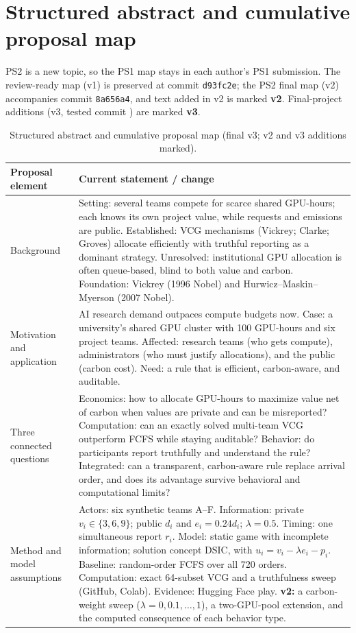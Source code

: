 \section{Structured abstract and cumulative proposal map}\label{app:abstract}
PS2 is a new topic, so the PS1 map stays in each author's PS1 submission. The review-ready map (v1) is preserved at commit \texttt{d93fc2e}; the PS2 final map (v2) accompanies commit \texttt{8a656a4}, and text added in v2 is marked \textbf{v2}. Final-project additions (v3, tested commit \texttt{\TestedCommit}) are marked \textbf{v3}.
\par\medskip
\begin{table}[H]
\caption{Structured abstract and cumulative proposal map (final v3; v2 and v3 additions marked).}
\label{tab:abstract-map}
\footnotesize\renewcommand{\arraystretch}{1.1}
\begin{tabularx}{\textwidth}{@{}p{}Y@{}}
\toprule
\textbf{Proposal element} & \textbf{Current statement / change} \\
\midrule
Background & Setting: several teams compete for scarce shared GPU-hours; each knows its own project value, while requests and emissions are public. Established: VCG mechanisms (Vickrey; Clarke; Groves) allocate efficiently with truthful reporting as a dominant strategy. Unresolved: institutional GPU allocation is often queue-based, blind to both value and carbon. Foundation: Vickrey (1996 Nobel) and Hurwicz--Maskin--Myerson (2007 Nobel). \\
Motivation and application & AI research demand outpaces compute budgets now. Case: a university's shared GPU cluster with 100 GPU-hours and six project teams. Affected: research teams (who gets compute), administrators (who must justify allocations), and the public (carbon cost). Need: a rule that is efficient, carbon-aware, and auditable. \\
Three connected questions & Economics: how to allocate GPU-hours to maximize value net of carbon when values are private and can be misreported? Computation: can an exactly solved multi-team VCG outperform FCFS while staying auditable? Behavior: do participants report truthfully and understand the rule? Integrated: can a transparent, carbon-aware rule replace arrival order, and does its advantage survive behavioral and computational limits? \\
Method and model assumptions & Actors: six synthetic teams A--F. Information: private $v_i\in\{3,6,9\}$; public $d_i$ and $e_i=0.24d_i$; $\lambda=0.5$. Timing: one simultaneous report $r_i$. Model: static game with incomplete information; solution concept DSIC, with $u_i=v_i-\lambda e_i-p_i$. Baseline: random-order FCFS over all 720 orders. Computation: exact 64-subset VCG and a truthfulness sweep (GitHub, Colab). Evidence: Hugging Face play. \textbf{v2:} a carbon-weight sweep ($\lambda=0,0.1,\dots,1$), a two-GPU-pool extension, and the computed consequence of each behavior type. \\

\end{tabularx}
\end{table}
